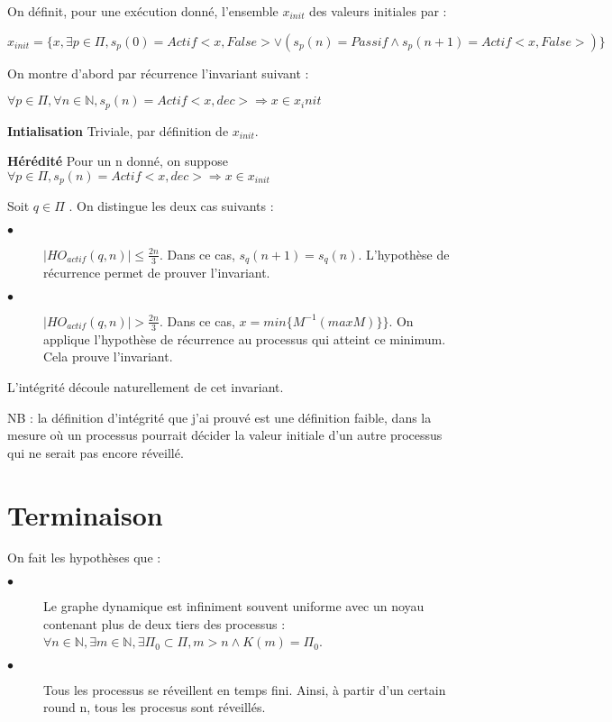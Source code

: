\documentclass{article}
\begin{document}
On définit, pour une exécution donné, l'ensemble $x_{init}$ des valeurs initiales par : 

$x_{init} = \{ x , \exists p \in \Pi, s_p(0) = Actif < x, False> \vee ( s_p(n) = Passif \wedge s_p(n+1) = Actif < x, False> ) \} $

\vspace{0.5cm}

On montre d'abord par récurrence l'invariant suivant : 

$ \forall p \in \Pi, \forall n \in \mathds{N}, s_p(n) = Actif <x, dec> \Rightarrow x \in x_init$

\textbf{Intialisation}
Triviale, par définition de $x_{init}$.

\textbf{Hérédité}
Pour un n donné, on suppose $\forall p \in \Pi, s_p(n) = Actif <x, dec> \Rightarrow x \in x_{init}$

Soit $q \in \Pi$ . On distingue les deux cas suivants :
\begin{description}

\item[$\bullet$] $|HO_{actif} (q, n) | \leq \frac{2n}{3}$. Dans ce cas, $s_q(n+1) = s_q(n)$. L'hypothèse de récurrence permet de prouver l'invariant.
\item[$\bullet$] $|HO_{actif} (q, n) | > \frac{2n}{3}$. Dans ce cas, $x = min \{M^{-1} (max M)\}\}$. On applique l'hypothèse de récurrence au processus qui atteint ce minimum. Cela prouve l'invariant.

\end{description}

L'intégrité découle naturellement de cet invariant.

NB : la définition d'intégrité que j'ai prouvé est une définition faible, dans la mesure où un processus pourrait décider la valeur initiale d'un autre processus qui ne serait pas encore réveillé. 

\section{Terminaison}

On fait les hypothèses que :
\begin{description}

\item[$\bullet$] Le graphe dynamique est infiniment souvent uniforme avec un noyau contenant plus de deux tiers des processus : $\forall n \in \mathds{N}, \exists m \in \mathds{N}, \exists \Pi_0 \subset \Pi, m > n \wedge K(m) = \Pi_0$.
\item[$\bullet$] Tous les processus se réveillent en temps fini. Ainsi, à partir d'un certain round n, tous les procesus sont réveillés.

\end{description}
\end{document}
